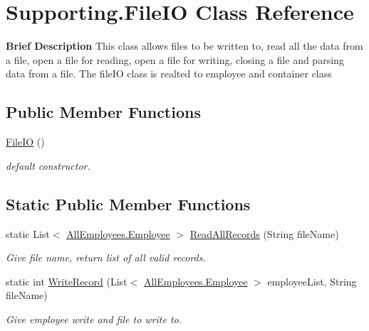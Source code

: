 \hypertarget{class_supporting_1_1_file_i_o}{}\section{Supporting.\+File\+I\+O Class Reference}
\label{class_supporting_1_1_file_i_o}


{\bfseries Brief Description} This class allows files to be written to, read all the data from a file, open a file for reading, open a file for writing, closing a file and parsing data from a file. The file\+I\+O class is realted to employee and container class  


\subsection*{Public Member Functions}
\begin{DoxyCompactItemize}
\item 
\hyperlink{class_supporting_1_1_file_i_o_a98bf48b6b28f84aa8cb879fba0ec3869}{File\+I\+O} ()
\begin{DoxyCompactList}\small\item\em default constructor. \end{DoxyCompactList}\end{DoxyCompactItemize}
\subsection*{Static Public Member Functions}
\begin{DoxyCompactItemize}
\item 
static List$<$ \hyperlink{class_all_employees_1_1_employee}{All\+Employees.\+Employee} $>$ \hyperlink{class_supporting_1_1_file_i_o_a85a68c35769506cf140f4dd0f937c182}{Read\+All\+Records} (String file\+Name)
\begin{DoxyCompactList}\small\item\em Give file name, return list of all valid records. \end{DoxyCompactList}\item 
static int \hyperlink{class_supporting_1_1_file_i_o_a6bf6984a4cc3fe887ad1e417991f3590}{Write\+Record} (List$<$ \hyperlink{class_all_employees_1_1_employee}{All\+Employees.\+Employee} $>$ employee\+List, String file\+Name)
\begin{DoxyCompactList}\small\item\em Give employee write and file to write to. \end{DoxyCompactList}\end{DoxyCompactItemize}
